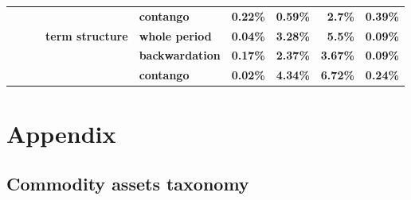 \documentclass[
  authoryear,
  preprint,
  3p]{elsarticle}
\begin{document}
\begin{longtable}[t]{>{}l>{}l>{}l>{}l>{}l>{}r>{}r>{}r>{}r}
\textbf{} & \textbf{} & \textbf{} & \textbf{} & \textbf{contango} & \textcolor[HTML]{4285f4}{\textbf{0.22\%}} & \textcolor[HTML]{4285f4}{\textbf{0.59\%}} & \textcolor[HTML]{4285f4}{\textbf{2.7\%}} & \textcolor[HTML]{4285f4}{\textbf{0.39\%}}\\
\textbf{} & \textbf{} & \textbf{} & \textbf{term structure} & \textbf{whole period} & \textcolor[HTML]{4285f4}{\textbf{0.04\%}} & \textcolor[HTML]{4285f4}{\textbf{3.28\%}} & \textcolor[HTML]{4285f4}{\textbf{5.5\%}} & \textcolor[HTML]{4285f4}{\textbf{0.09\%}}\\
\textbf{} & \textbf{} & \textbf{} & \textbf{} & \textbf{backwardation} & \textcolor[HTML]{4285f4}{\textbf{0.17\%}} & \textcolor[HTML]{4285f4}{\textbf{2.37\%}} & \textcolor[HTML]{4285f4}{\textbf{3.67\%}} & \textcolor[HTML]{4285f4}{\textbf{0.09\%}}\\
\addlinespace
\textbf{} & \textbf{} & \textbf{} & \textbf{} & \textbf{contango} & \textcolor[HTML]{4285f4}{\textbf{0.02\%}} & \textcolor[HTML]{4285f4}{\textbf{4.34\%}} & \textcolor[HTML]{4285f4}{\textbf{6.72\%}} & \textcolor[HTML]{4285f4}{\textbf{0.24\%}}\\
\bottomrule

\end{longtable}

\endgroup{}

\restoregeometry

\newpage

\section{Appendix}\label{appendix}

\subsection{Commodity assets taxonomy}\label{sec-taxonomy}

\begingroup\fontsize{7}{9}\selectfont
\end{document}
